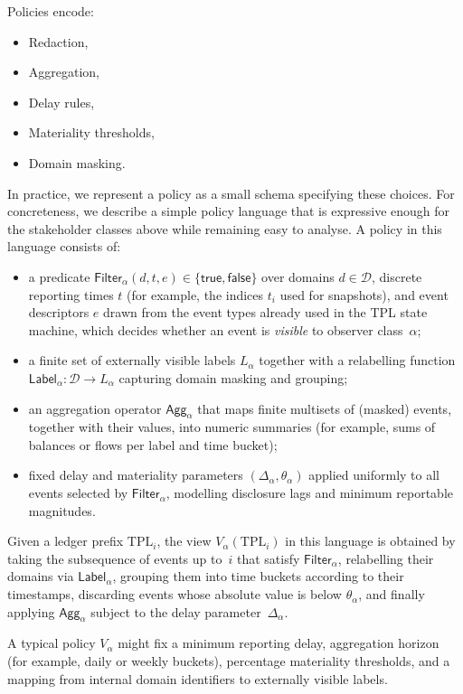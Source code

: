 \documentclass[11pt]{article}
\begin{document}
Policies encode:

\begin{itemize}[noitemsep]
\item Redaction,
\item Aggregation,
\item Delay rules,
\item Materiality thresholds,
\item Domain masking.
\end{itemize}

In practice, we represent a policy as a small schema specifying these choices.
For concreteness, we describe a simple policy language that is expressive enough for the stakeholder classes above
while remaining easy to analyse.
A policy in this language consists of:
\begin{itemize}[noitemsep]
  \item a predicate $\mathsf{Filter}_\alpha(d,t,e) \in \{\mathsf{true},\mathsf{false}\}$ over domains $d \in \mathcal{D}$, discrete reporting times $t$ (for example, the indices $t_i$ used for snapshots), and event descriptors $e$ drawn from the event types already used in the TPL state machine, which decides whether an event is \emph{visible} to observer class~$\alpha$;
  \item a finite set of externally visible labels $L_\alpha$ together with a relabelling function $\mathsf{Label}_\alpha : \mathcal{D} \to L_\alpha$ capturing domain masking and grouping;
  \item an aggregation operator $\mathsf{Agg}_\alpha$ that maps finite multisets of (masked) events, together with their values, into numeric summaries (for example, sums of balances or flows per label and time bucket);
  \item fixed delay and materiality parameters $(\Delta_\alpha,\theta_\alpha)$ applied uniformly to all events selected by $\mathsf{Filter}_\alpha$, modelling disclosure lags and minimum reportable magnitudes.
\end{itemize}
Given a ledger prefix $\mathrm{TPL}_i$, the view $V_\alpha(\mathrm{TPL}_i)$ in this language is obtained by taking the subsequence of events up to~$i$ that satisfy $\mathsf{Filter}_\alpha$, relabelling their domains via $\mathsf{Label}_\alpha$, grouping them into time buckets according to their timestamps, discarding events whose absolute value is below $\theta_\alpha$, and finally applying $\mathsf{Agg}_\alpha$ subject to the delay parameter~$\Delta_\alpha$.

A typical policy $V_\alpha$ might fix a minimum reporting delay, aggregation horizon (for example, daily or weekly buckets), percentage materiality thresholds, and a mapping from internal domain identifiers to externally visible labels.
\end{document}
